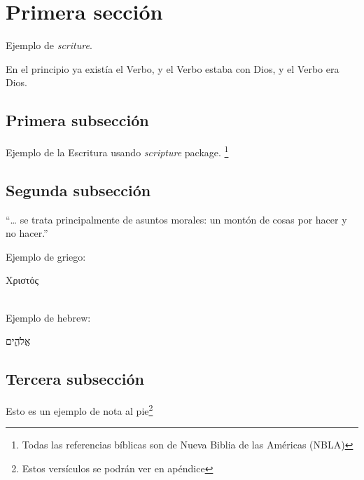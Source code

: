 \section{Primera sección}
Ejemplo de \emph{scriture}.
\begin{scripture}[Juan 1:1][version=LBLA]
	En el principio ya existía el Verbo, y el Verbo estaba con Dios, y el Verbo era Dios.
\end{scripture}
\subsection{Primera subsección}
Ejemplo de la Escritura usando \emph{scripture} package.
\footnote{Todas las referencias bíblicas son de Nueva Biblia de las Américas (NBLA)}
\subsection{Segunda subsección}
\enquote{\ldots{} se trata principalmente de asuntos morales: un montón de cosas por hacer y no hacer.}\autocite{librodesantiagobykrugger}

Ejemplo de griego: \begin{greek}Χριστὀς\end{greek}\\
Ejemplo de hebrew: \begin{hebrew}אֱלֹהִ֑ים\end{hebrew}
\subsection{Tercera subsección}
Esto es un ejemplo de nota al pie\footnote{Estos versículos se podrán ver en apéndice}
